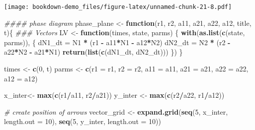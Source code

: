 \documentclass[
]{book}
\newenvironment{Shaded}{\begin{snugshade}}{\end{snugshade}}
\newcommand{\CommentTok}[1]{\textcolor[rgb]{0.56,0.35,0.01}{\textit{#1}}}
\newcommand{\ControlFlowTok}[1]{\textcolor[rgb]{0.13,0.29,0.53}{\textbf{#1}}}
\newcommand{\DataTypeTok}[1]{\textcolor[rgb]{0.13,0.29,0.53}{#1}}
\newcommand{\DecValTok}[1]{\textcolor[rgb]{0.00,0.00,0.81}{#1}}
\newcommand{\KeywordTok}[1]{\textcolor[rgb]{0.13,0.29,0.53}{\textbf{#1}}}
\newcommand{\NormalTok}[1]{#1}
\newcommand{\OperatorTok}[1]{\textcolor[rgb]{0.81,0.36,0.00}{\textbf{#1}}}
\newcommand{\StringTok}[1]{\textcolor[rgb]{0.31,0.60,0.02}{#1}}
\begin{document}
\texttt{[image: bookdown-demo\_files/figure-latex/unnamed-chunk-21-8.pdf]}

\begin{Shaded}
\begin{Highlighting}[]
\CommentTok{#### phase diagram}
\NormalTok{phase_plane <-}\StringTok{ }\ControlFlowTok{function}\NormalTok{(r1, r2, a11, a21, a22, a12, title, t)\{}
    \CommentTok{### Vectors}
\NormalTok{  LV <-}\StringTok{ }\ControlFlowTok{function}\NormalTok{(times, state, parms) \{}
    \KeywordTok{with}\NormalTok{(}\KeywordTok{as.list}\NormalTok{(}\KeywordTok{c}\NormalTok{(state, parms)), \{}
\NormalTok{      dN1_dt =}\StringTok{ }\NormalTok{N1 }\OperatorTok{*}\StringTok{ }\NormalTok{(r1 }\OperatorTok{-}\StringTok{ }\NormalTok{a11}\OperatorTok{*}\NormalTok{N1 }\OperatorTok{-}\StringTok{ }\NormalTok{a12}\OperatorTok{*}\NormalTok{N2)}
\NormalTok{      dN2_dt =}\StringTok{ }\NormalTok{N2 }\OperatorTok{*}\StringTok{ }\NormalTok{(r2 }\OperatorTok{-}\StringTok{ }\NormalTok{a22}\OperatorTok{*}\NormalTok{N2 }\OperatorTok{-}\StringTok{ }\NormalTok{a21}\OperatorTok{*}\NormalTok{N1)}
      \KeywordTok{return}\NormalTok{(}\KeywordTok{list}\NormalTok{(}\KeywordTok{c}\NormalTok{(dN1_dt, dN2_dt)))}
\NormalTok{    \})}
\NormalTok{  \}}

\NormalTok{  times <-}\StringTok{ }\KeywordTok{c}\NormalTok{(}\DecValTok{0}\NormalTok{, t)}
\NormalTok{  parms <-}\StringTok{ }\KeywordTok{c}\NormalTok{(}\DataTypeTok{r1 =}\NormalTok{ r1, }\DataTypeTok{r2 =}\NormalTok{ r2, }\DataTypeTok{a11 =}\NormalTok{ a11, }\DataTypeTok{a21 =}\NormalTok{ a21, }\DataTypeTok{a22 =}\NormalTok{ a22, }\DataTypeTok{a12 =}\NormalTok{ a12)}

\NormalTok{  x_inter<-}\StringTok{ }\KeywordTok{max}\NormalTok{(}\KeywordTok{c}\NormalTok{(r1}\OperatorTok{/}\NormalTok{a11, r2}\OperatorTok{/}\NormalTok{a21))}
\NormalTok{  y_inter <-}\StringTok{ }\KeywordTok{max}\NormalTok{(}\KeywordTok{c}\NormalTok{(r2}\OperatorTok{/}\NormalTok{a22, r1}\OperatorTok{/}\NormalTok{a12))}

  \CommentTok{# create position of arrows}
\NormalTok{  vector_grid <-}\StringTok{ }\KeywordTok{expand.grid}\NormalTok{(}\KeywordTok{seq}\NormalTok{(}\DecValTok{5}\NormalTok{, x_inter, }\DataTypeTok{length.out =} \DecValTok{10}\NormalTok{),}
                             \KeywordTok{seq}\NormalTok{(}\DecValTok{5}\NormalTok{, y_inter, }\DataTypeTok{length.out =} \DecValTok{10}\NormalTok{))}


\end{Highlighting}
\end{Shaded}
\end{document}
